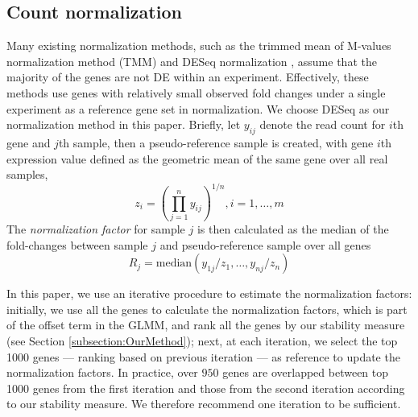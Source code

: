 \documentclass[11pt, a4paper]{article}
\begin{document}

\subsection{Count normalization}\label{section:countNormalization}

Many existing normalization methods, such as the trimmed mean of M-values normalization method (TMM) \citep{robinson2010scaling} and DESeq normalization \citep{anders2010differential}, assume that the majority of the genes are not DE within an experiment. Effectively, these methods use genes with relatively small observed fold changes under a single experiment as a reference gene set in normalization. We choose DESeq \citep{anders2010differential} as our normalization method in this paper. Briefly, let $y_{ij}$ denote the read count for $i$th gene and $j$th sample, then a pseudo-reference sample is created, with gene $i$th expression value defined as the geometric mean of the same gene over all real samples, 
\[ z_i = (\prod_{j=1}^ny_{ij})^{1/n},  i=1, \ldots, m \]
 The \textit{normalization factor} for sample $j$ is then calculated as the median of the fold-changes between sample $j$ and pseudo-reference sample over all genes
  \begin{equation}\label{eq:normfactors} 
 R_j = \text{median}(y_{1j}/z_1, \ldots, y_{nj}/z_n)
  \end{equation}

In this paper, we use an iterative procedure to estimate the normalization factors: initially, we use all the genes to calculate the normalization factors, which is part of the offset term in the GLMM, and rank all the genes by our stability measure (see Section \ref{subsection:OurMethod}); next, at each iteration, we select the top 1000 genes ---  ranking based on previous iteration --- as reference to update the normalization factors. In practice, over $950$ genes are overlapped between top 1000 genes from the first iteration and those from the second iteration according to our stability measure. We therefore recommend one iteration to be sufficient.  
\end{document}
